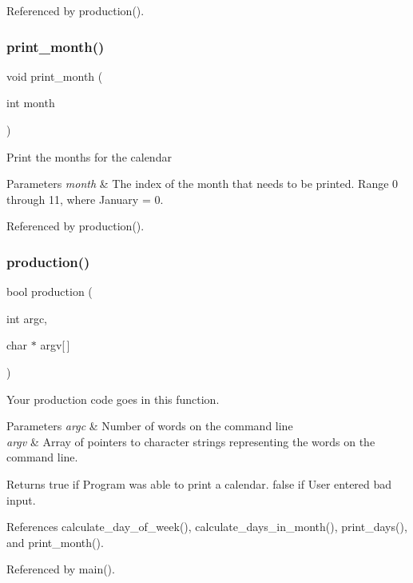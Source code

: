 Referenced by production().

\mbox{\label{production_8c_a34310537187ec4eccf481cbaad317e45}} 
\subsubsection{print\+\_\+month()}
{\footnotesize\ttfamily void print\+\_\+month (\begin{DoxyParamCaption}\item[{int}]{month }\end{DoxyParamCaption})}

Print the months for the calendar 
\begin{DoxyParams}{Parameters}
{\em month} & The index of the month that needs to be printed. Range 0 through 11, where January = 0. \\
\hline
\end{DoxyParams}


Referenced by production().

\mbox{\label{production_8c_a9f67b51c42a54745557e7a2c9c07c46f}} 
\subsubsection{production()}
{\footnotesize\ttfamily bool production (\begin{DoxyParamCaption}\item[{int}]{argc,  }\item[{char $\ast$}]{argv[$\,$] }\end{DoxyParamCaption})}

Your production code goes in this function.


\begin{DoxyParams}{Parameters}
{\em argc} & Number of words on the command line \\
\hline
{\em argv} & Array of pointers to character strings representing the words on the command line. \\
\hline
\end{DoxyParams}
\begin{DoxyReturn}{Returns}
true if Program was able to print a calendar. false if User entered bad input. 
\end{DoxyReturn}


References calculate\+\_\+day\+\_\+of\+\_\+week(), calculate\+\_\+days\+\_\+in\+\_\+month(), print\+\_\+days(), and print\+\_\+month().



Referenced by main().

